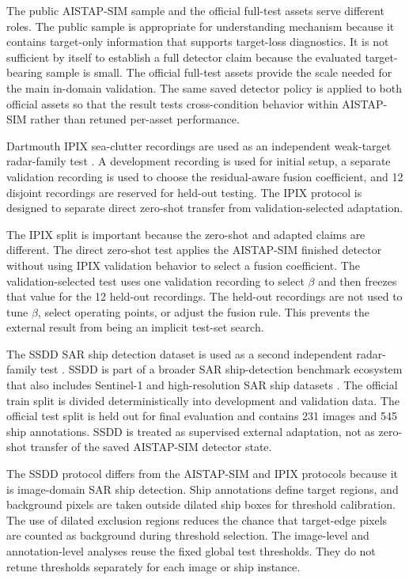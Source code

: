 \documentclass[journal]{IEEEtran}
\begin{document}
The public AISTAP-SIM sample and the official full-test assets serve different roles. The public sample is appropriate for understanding mechanism because it contains target-only information that supports target-loss diagnostics. It is not sufficient by itself to establish a full detector claim because the evaluated target-bearing sample is small. The official full-test assets provide the scale needed for the main in-domain validation. The same saved detector policy is applied to both official assets so that the result tests cross-condition behavior within AISTAP-SIM rather than retuned per-asset performance.

Dartmouth IPIX sea-clutter recordings are used as an independent weak-target radar-family test \cite{haykin2002seaclutter,dewind2010database}. A development recording is used for initial setup, a separate validation recording is used to choose the residual-aware fusion coefficient, and 12 disjoint recordings are reserved for held-out testing. The IPIX protocol is designed to separate direct zero-shot transfer from validation-selected adaptation.

The IPIX split is important because the zero-shot and adapted claims are different. The direct zero-shot test applies the AISTAP-SIM finished detector without using IPIX validation behavior to select a fusion coefficient. The validation-selected test uses one validation recording to select $\beta$ and then freezes that value for the 12 held-out recordings. The held-out recordings are not used to tune $\beta$, select operating points, or adjust the fusion rule. This prevents the external result from being an implicit test-set search.

The SSDD SAR ship detection dataset is used as a second independent radar-family test \cite{wang2019ssdd,zhang2021ssdd}. SSDD is part of a broader SAR ship-detection benchmark ecosystem that also includes Sentinel-1 and high-resolution SAR ship datasets \cite{huang2018opensarship,wei2020hrsid}. The official train split is divided deterministically into development and validation data. The official test split is held out for final evaluation and contains 231 images and 545 ship annotations. SSDD is treated as supervised external adaptation, not as zero-shot transfer of the saved AISTAP-SIM detector state.

The SSDD protocol differs from the AISTAP-SIM and IPIX protocols because it is image-domain SAR ship detection. Ship annotations define target regions, and background pixels are taken outside dilated ship boxes for threshold calibration. The use of dilated exclusion regions reduces the chance that target-edge pixels are counted as background during threshold selection. The image-level and annotation-level analyses reuse the fixed global test thresholds. They do not retune thresholds separately for each image or ship instance.
\end{document}

